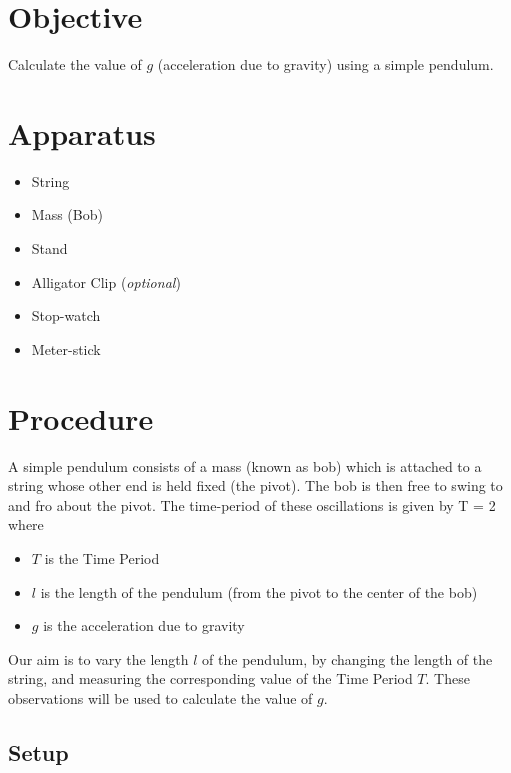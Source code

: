 \section{Objective}

    Calculate the value of $g$ (acceleration due to gravity) using a simple pendulum.

\section{Apparatus}

    \begin{itemize}

        \item String
        \item Mass (Bob)
        \item Stand
        \item Alligator Clip (\textit{optional})
        \item Stop-watch
        \item Meter-stick

    \end{itemize}

\section{Procedure}

    A simple pendulum consists of a mass (known as bob) which is attached to a string whose other end is held fixed (the pivot). The bob is then free to swing to and fro about the pivot. The time-period of these oscillations is given by
    \beq \label{main}
        T = 2 \pi {}
    \eeq
    where
    \begin{itemize}
        \item $T$ is the Time Period
        \item $l$ is the length of the pendulum (from the pivot to the center of the bob)
        \item $g$ is the acceleration due to gravity
    \end{itemize}

    Our aim is to vary the length $l$ of the pendulum, by changing the length of the string, and measuring the corresponding value of the Time Period $T$. These observations will be used to calculate the value of $g$.

\subsection{Setup}

